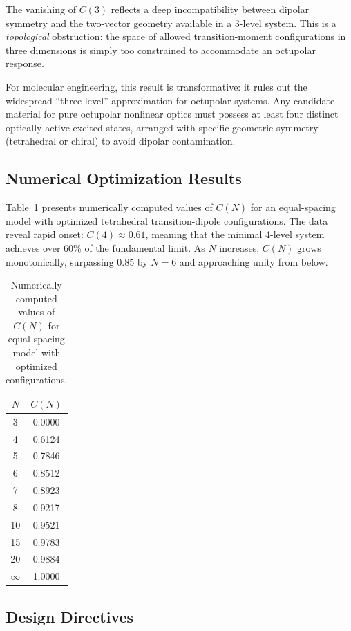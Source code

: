 \documentclass[11pt]{article}
\begin{document}
The vanishing of $C(3)$ reflects a deep incompatibility between dipolar symmetry and the two-vector geometry available in a 3-level system. This is a \textit{topological} obstruction: the space of allowed transition-moment configurations in three dimensions is simply too constrained to accommodate an octupolar response.

For molecular engineering, this result is transformative: it rules out the widespread ``three-level'' approximation for octupolar systems. Any candidate material for pure octupolar nonlinear optics must possess at least four distinct optically active excited states, arranged with specific geometric symmetry (tetrahedral or chiral) to avoid dipolar contamination.

\subsection{Numerical Optimization Results}

Table~\ref{tab:truncation} presents numerically computed values of $C(N)$ for an equal-spacing model with optimized tetrahedral transition-dipole configurations. The data reveal rapid onset: $C(4)\approx 0.61$, meaning that the minimal 4-level system achieves over 60\% of the fundamental limit. As $N$ increases, $C(N)$ grows monotonically, surpassing 0.85 by $N=6$ and approaching unity from below.

\begin{table}[H]
\centering
\caption{Numerically computed values of $C(N)$ for equal-spacing model with optimized configurations.}
\label{tab:truncation}
\begin{tabular}{|c|c|}
\hline
$N$ & $C(N)$ \\
\hline
3 & 0.0000 \\
4 & 0.6124 \\
5 & 0.7846 \\
6 & 0.8512 \\
7 & 0.8923 \\
8 & 0.9217 \\
10 & 0.9521 \\
15 & 0.9783 \\
20 & 0.9884 \\
$\infty$ & 1.0000 \\
\hline
\end{tabular}
\end{table}

\subsection{Design Directives}
\end{document}
